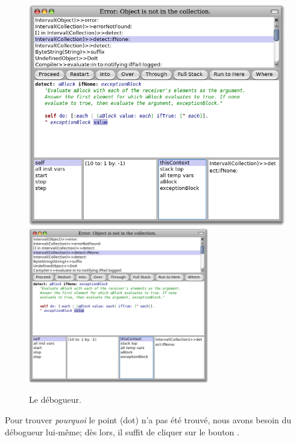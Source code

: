 \documentclass[a4paper,10pt,twoside]{book}
\begin{document}
\begin{figure}[btp]
	\begin{center}
	\ifluluelse
		{\includegraphics[width=\textwidth]{debuggerDetectIfNone}}
		{\includegraphics[width=0.7\textwidth]{debuggerDetectIfNone}}
	\end{center}
	\caption{Le débogueur.}
\end{figure}

Pour trouver \emph{pourquoi} le point (dot) n'a pas été trouvé,
nous avons besoin du débogueur lui-même; dès lors, il suffit de
cliquer sur le bouton .

\end{document}
